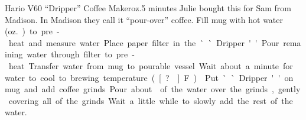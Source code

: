 \begin{recipe}{Hario V60\tm{} ``Dripper'' Coffee Maker}{\unit[6--8]{oz.}}{5 minutes}
\freeform Julie bought this for Sam from Madison.  In Madison they
call it ``pour-over'' coffee.
 Fill mug with hot water
(\unit[6--8]{oz.}) to pre-heat and measure water.  Place paper filter in the
``Dripper.'' Pour remaining water through filter to pre-heat.
Transfer water from mug to pourable vessel.  Wait about a minute for water to cool to brewing temperature (\unit[?\0]{F}).
 Put ``Dripper'' on mug and add coffee
grinds.  Pour about  of the water over the grinds, gently
covering all of the grinds.  Wait a little while to slowly add the
rest of the water.
\end{recipe}

